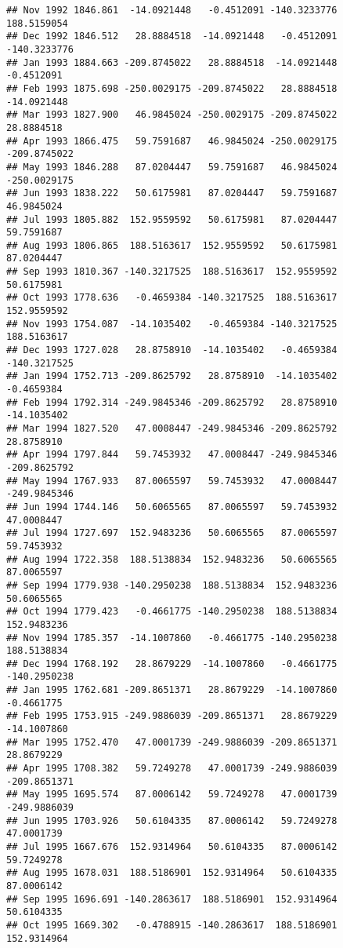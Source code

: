 \documentclass[]{article}
\begin{document}
\begin{verbatim}
## Nov 1992 1846.861  -14.0921448   -0.4512091 -140.3233776  188.5159054
## Dec 1992 1846.512   28.8884518  -14.0921448   -0.4512091 -140.3233776
## Jan 1993 1884.663 -209.8745022   28.8884518  -14.0921448   -0.4512091
## Feb 1993 1875.698 -250.0029175 -209.8745022   28.8884518  -14.0921448
## Mar 1993 1827.900   46.9845024 -250.0029175 -209.8745022   28.8884518
## Apr 1993 1866.475   59.7591687   46.9845024 -250.0029175 -209.8745022
## May 1993 1846.288   87.0204447   59.7591687   46.9845024 -250.0029175
## Jun 1993 1838.222   50.6175981   87.0204447   59.7591687   46.9845024
## Jul 1993 1805.882  152.9559592   50.6175981   87.0204447   59.7591687
## Aug 1993 1806.865  188.5163617  152.9559592   50.6175981   87.0204447
## Sep 1993 1810.367 -140.3217525  188.5163617  152.9559592   50.6175981
## Oct 1993 1778.636   -0.4659384 -140.3217525  188.5163617  152.9559592
## Nov 1993 1754.087  -14.1035402   -0.4659384 -140.3217525  188.5163617
## Dec 1993 1727.028   28.8758910  -14.1035402   -0.4659384 -140.3217525
## Jan 1994 1752.713 -209.8625792   28.8758910  -14.1035402   -0.4659384
## Feb 1994 1792.314 -249.9845346 -209.8625792   28.8758910  -14.1035402
## Mar 1994 1827.520   47.0008447 -249.9845346 -209.8625792   28.8758910
## Apr 1994 1797.844   59.7453932   47.0008447 -249.9845346 -209.8625792
## May 1994 1767.933   87.0065597   59.7453932   47.0008447 -249.9845346
## Jun 1994 1744.146   50.6065565   87.0065597   59.7453932   47.0008447
## Jul 1994 1727.697  152.9483236   50.6065565   87.0065597   59.7453932
## Aug 1994 1722.358  188.5138834  152.9483236   50.6065565   87.0065597
## Sep 1994 1779.938 -140.2950238  188.5138834  152.9483236   50.6065565
## Oct 1994 1779.423   -0.4661775 -140.2950238  188.5138834  152.9483236
## Nov 1994 1785.357  -14.1007860   -0.4661775 -140.2950238  188.5138834
## Dec 1994 1768.192   28.8679229  -14.1007860   -0.4661775 -140.2950238
## Jan 1995 1762.681 -209.8651371   28.8679229  -14.1007860   -0.4661775
## Feb 1995 1753.915 -249.9886039 -209.8651371   28.8679229  -14.1007860
## Mar 1995 1752.470   47.0001739 -249.9886039 -209.8651371   28.8679229
## Apr 1995 1708.382   59.7249278   47.0001739 -249.9886039 -209.8651371
## May 1995 1695.574   87.0006142   59.7249278   47.0001739 -249.9886039
## Jun 1995 1703.926   50.6104335   87.0006142   59.7249278   47.0001739
## Jul 1995 1667.676  152.9314964   50.6104335   87.0006142   59.7249278
## Aug 1995 1678.031  188.5186901  152.9314964   50.6104335   87.0006142
## Sep 1995 1696.691 -140.2863617  188.5186901  152.9314964   50.6104335
## Oct 1995 1669.302   -0.4788915 -140.2863617  188.5186901  152.9314964

\end{verbatim}
\end{document}
